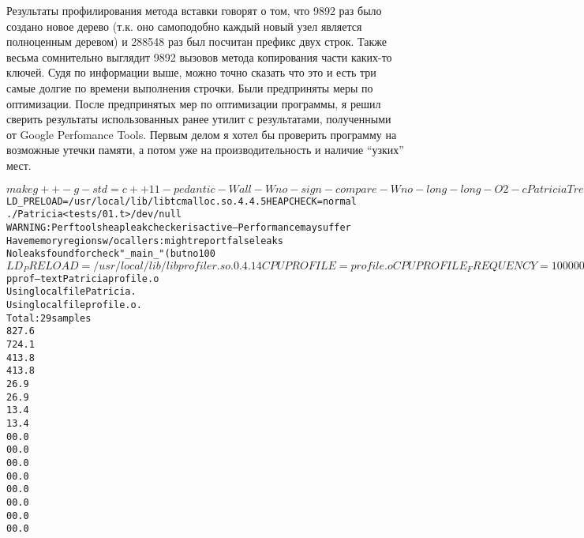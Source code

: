 \documentclass[pdf, unicode, 12pt, a4paper,oneside,fleqn]{article}
\begin{document}
Результаты профилирования метода вставки говорят о том, что 9892 раз было создано новое дерево (т.к. оно самоподобно каждый новый узел является полноценным деревом) и 288548 раз был посчитан префикс двух строк. Также весьма сомнительно выглядит 9892 вызовов метода копирования части каких-то ключей. Судя по информации выше, можно точно сказать что это и есть три самые долгие по времени выполнения строчки. Были предприняты меры по оптимизации.
\newpage
После предпринятых мер по оптимизации программы, я решил сверить результаты использованных ранее утилит с результатами, полученными от Google Perfomance Tools. Первым делом я хотел бы проверить программу на возможные утечки памяти, а потом уже на производительность и наличие \enquote{узких} мест.
\begin{alltt}
$ make
g++ -g -std=c++11 -pedantic -Wall -Wno-sign-compare -Wno-long-long 
-O2 -c PatriciaTree.cpp
g++ -g -std=c++11 -pedantic -Wall -Wno-sign-compare -Wno-long-long 
-O2 -c main.cpp
g++ -g -std=c++11 -pedantic -Wall -Wno-sign-compare -Wno-long-long 
-O2 -o Patricia PatriciaTree.o main.o -lm
$ LD_PRELOAD=/usr/local/lib/libtcmalloc.so.4.4.5 HEAPCHECK=normal 
./Patricia < tests/01.t > /dev/null
WARNING: Perftools heap leak checker is active -- Performance may suffer
Have memory regions w/o callers: might report false leaks
No leaks found for check "_main_" (but no 100
% guarantee that there aren't any): found 16 reachable heap objects of 81386 bytes
$ LD_PRELOAD=/usr/local/lib/libprofiler.so.0.4.14 CPUPROFILE=profile.o
 CPUPROFILE_FREQUENCY=100000 ./Patricia < tests/01.t > /dev/null
PROFILE: interrupts/evictions/bytes = 29/13/1640
$ pprof --text Patricia profile.o
Using local file Patricia.
Using local file profile.o.
Total: 29 samples
       8  27.6%  27.6%       25  86.2% std::operator>>
       7  24.1%  51.7%        7  24.1% _IO_getc
       4  13.8%  65.5%        4  13.8% _IO_acquire_lock_fct
       4  13.8%  79.3%        6  20.7% _IO_ungetc
       2   6.9%  86.2%        2   6.9% Prefix (inline)
       2   6.9%  93.1%        2   6.9% __GI__IO_sputbackc
       1   3.4%  96.6%        1   3.4% LengthString (inline)
       1   3.4% 100.0%        4  13.8% __gnu_cxx::stdio_sync_filebuf::uflow
       0   0.0% 100.0%        2   6.9% TPatriciaTree::Remove
       0   0.0% 100.0%        6  20.7% __gnu_cxx::stdio_sync_filebuf::underflow
       0   0.0% 100.0%       29 100.0% __libc_start_main
       0   0.0% 100.0%       29 100.0% _start
       0   0.0% 100.0%       29 100.0% main
       0   0.0% 100.0%        1   3.4% std::istream::_M_extract
       0   0.0% 100.0%        1   3.4% std::istream::operator>> (inline)
       0   0.0% 100.0%        1   3.4% std::istream::sentry::sentry
\end{alltt}
\end{document}
